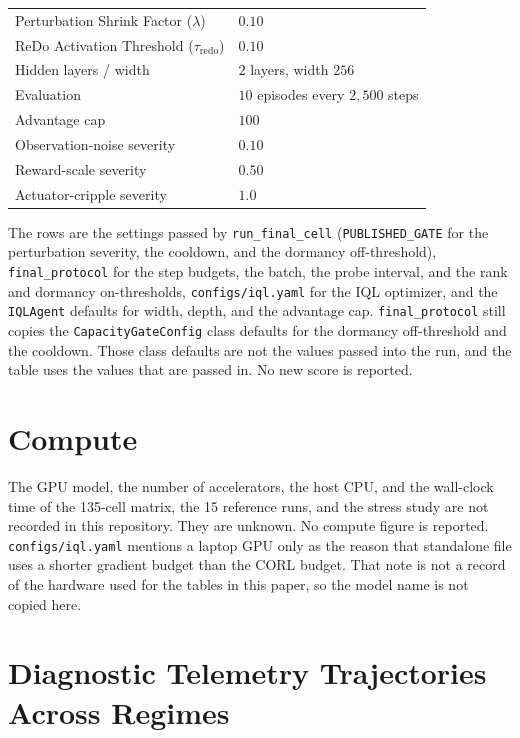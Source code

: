 \documentclass{article}
\begin{document}
\begin{table}[h]
\begin{tabular}{ll}
Perturbation Shrink Factor ($\lambda$) & $0.10$ \\
ReDo Activation Threshold ($\tau_{\mathrm{redo}}$) & $0.10$ \\
Hidden layers / width & $2$ layers, width $256$ \\
Evaluation & $10$ episodes every $2,500$ steps \\
Advantage cap & $100$ \\
Observation-noise severity & $0.10$ \\
Reward-scale severity & $0.50$ \\
Actuator-cripple severity & $1.0$ \\
\bottomrule
\end{tabular}
\end{table}

The rows are the settings passed by \texttt{run\_final\_cell} (\texttt{PUBLISHED\_GATE} for the perturbation severity, the cooldown, and the dormancy off-threshold), \texttt{final\_protocol} for the step budgets, the batch, the probe interval, and the rank and dormancy on-thresholds, \texttt{configs/iql.yaml} for the IQL optimizer, and the \texttt{IQLAgent} defaults for width, depth, and the advantage cap. \texttt{final\_protocol} still copies the \texttt{CapacityGateConfig} class defaults for the dormancy off-threshold and the cooldown. Those class defaults are not the values passed into the run, and the table uses the values that are passed in. No new score is reported.

\section{Compute}
\label{app:compute}

The GPU model, the number of accelerators, the host CPU, and the wall-clock time of the 135-cell matrix, the 15 reference runs, and the stress study are not recorded in this repository. They are unknown. No compute figure is reported. \texttt{configs/iql.yaml} mentions a laptop GPU only as the reason that standalone file uses a shorter gradient budget than the CORL budget. That note is not a record of the hardware used for the tables in this paper, so the model name is not copied here.

\section{Diagnostic Telemetry Trajectories Across Regimes}
\label{app:telemetry_plots}
\end{document}
